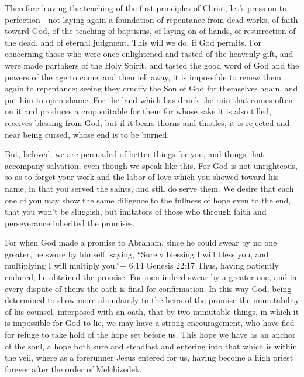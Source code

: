  Therefore leaving the teaching of the first principles of
Christ, let's press on to perfection---not laying again a foundation of
repentance from dead works, of faith toward God,  of the
teaching of baptisms, of laying on of hands, of resurrection of the
dead, and of eternal judgment.  This will we do, if God
permits.  For concerning those who were once enlightened and
tasted of the heavenly gift, and were made partakers of the Holy Spirit,
 and tasted the good word of God and the powers of the age
to come,  and then fell away, it is impossible to renew them
again to repentance; seeing they crucify the Son of God for themselves
again, and put him to open shame.  For the land which has
drunk the rain that comes often on it and produces a crop suitable for
them for whose sake it is also tilled, receives blessing from God;
 but if it bears thorns and thistles, it is rejected and
near being cursed, whose end is to be burned.

 But, beloved, we are persuaded of better things for you,
and things that accompany salvation, even though we speak like this.
 For God is not unrighteous, so as to forget your work and
the labor of love which you showed toward his name, in that you served
the saints, and still do serve them.  We desire that each
one of you may show the same diligence to the fullness of hope even to
the end,  that you won't be sluggish, but imitators of
those who through faith and perseverance inherited the promises.

 For when God made a promise to Abraham, since he could
swear by no one greater, he swore by himself,  saying,
``Surely blessing I will bless you, and multiplying I will multiply
you.''+ 6:14 Genesis 22:17  Thus, having patiently endured,
he obtained the promise.  For men indeed swear by a greater
one, and in every dispute of theirs the oath is final for confirmation.
 In this way God, being determined to show more abundantly
to the heirs of the promise the immutability of his counsel, interposed
with an oath,  that by two immutable things, in which it is
impossible for God to lie, we may have a strong encouragement, who have
fled for refuge to take hold of the hope set before us. 
This hope we have as an anchor of the soul, a hope both sure and
steadfast and entering into that which is within the veil, 
where as a forerunner Jesus entered for us, having become a high priest
forever after the order of Melchizedek.

